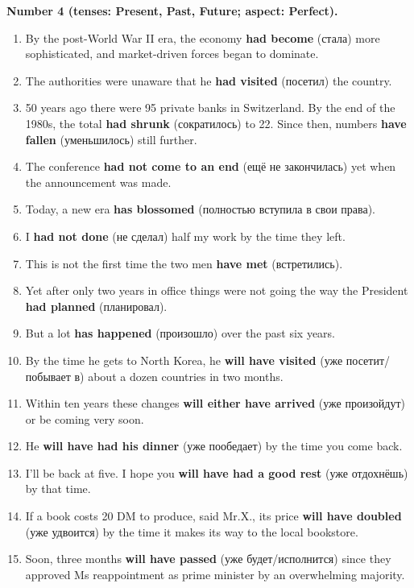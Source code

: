 \documentclass[main.tex]{subfiles}
\begin{document}
\textbf{Number 4 (tenses: Present, Past, Future; aspect: Perfect).}

\begin{enumerate}[nosep]
	\item By the post-World War II era, the economy \textbf{had become} (стала) more sophisticated, and market-driven forces began to dominate.
	\item The authorities were unaware that he \textbf{had visited} (посетил) the country.
	\item 50 years ago there were 95 private banks in Switzerland. By the end of the 1980s, the total \textbf{had shrunk} (сократилось) to 22. Since then, numbers \textbf{have fallen} (уменьшилось) still further.
	\item The conference \textbf{had not come to an end} (ещё не закончилась) yet when the announcement was made.
	\item Today, a new era \textbf{has blossomed} (полностью вступила в свои права).
	\item I \textbf{had not done} (не сделал) half my work by the time they left.
	\item This is not the first time the two men \textbf{have met} (встретились).
	\item Yet after only two years in office things were not going the way the President \textbf{had planned} (планировал).
	\item But a lot \textbf{has happened} (произошло) over the past six years.
	\item By the time he gets to North Korea, he \textbf{will have visited} (уже посетит/побывает в) about a dozen countries in two months.
	\item Within ten years these changes \textbf{will either have arrived} (уже произойдут) or be coming very soon.
	\item He \textbf{will have had his dinner} (уже пообедает) by the time you come back.
	\item I'll be back at five. I hope you \textbf{will have had a good rest} (уже отдохнёшь) by that time.
	\item If a book costs 20 DM to produce, said Mr.X., its price \textbf{will have doubled} (уже удвоится) by the time it makes its way to the local bookstore.
	\item Soon, three months \textbf{will have passed} (уже будет/исполнится) since they approved Ms reappointment as prime minister by an overwhelming majority.
\end{enumerate}
\ 
\end{document}
